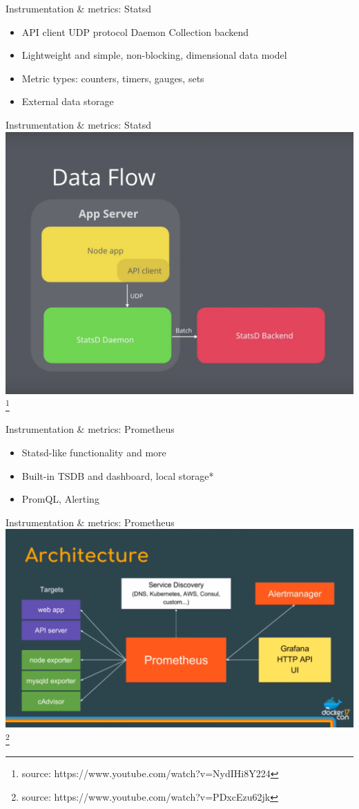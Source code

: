 \documentclass{beamer}
\newcommand\blfootnote[1]{%
  \begingroup
  \renewcommand\thefootnote{}\footnote{\tiny  #1 }%
  \addtocounter{footnote}{-1}%
  \endgroup
}
\begin{document}
\begin{frame}{Instrumentation \& metrics: Statsd}
  	\begin{itemize}
  		\item{API client \rightarrow UDP protocol \rightarrow Daemon \rightarrow Collection backend}
  		\item{Lightweight and simple, non-blocking, dimensional data model} %
  		\item{Metric types: counters, timers, gauges, sets}
  		\item{External data storage} %
	\end{itemize}
\end{frame}

\begin{frame}{Instrumentation \& metrics: Statsd}
	\centering
   	\includegraphics[width=.7\linewidth]{statsd_data_flow.png}
   	\blfootnote{source: https://www.youtube.com/watch?v=NydIHi8Y224}
\end{frame}


\begin{frame}{Instrumentation \& metrics: Prometheus}
	\begin{itemize}
		\item{Statsd-like functionality and more}
		\item{Built-in TSDB and dashboard, local storage*} %
		\item{PromQL, Alerting}
	\end{itemize}
\end{frame}

\begin{frame}{Instrumentation \& metrics: Prometheus}
	\centering
	\includegraphics[width=.9\linewidth]{prometheus_arch.png}
	\blfootnote{source: https://www.youtube.com/watch?v=PDxcEzu62jk}
\end{frame}
\end{document}
